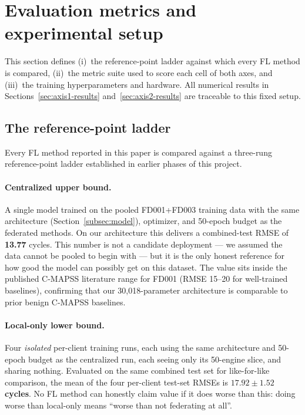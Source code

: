 \documentclass[a4paper,fleqn,doubleblind]{cas-sc}
\begin{document}

\section{Evaluation metrics and experimental setup}
\label{sec:setup}

This section defines (i)~the reference-point ladder against which
every FL method is compared, (ii)~the metric suite used to score
each cell of both axes, and (iii)~the training hyperparameters and
hardware. All numerical results in Sections~\ref{sec:axis1-results}
and~\ref{sec:axis2-results} are traceable to this fixed setup.

\subsection{The reference-point ladder}
\label{subsec:refladder}

Every FL method reported in this paper is compared against a
three-rung reference-point ladder established in earlier phases of
this project.

\paragraph{Centralized upper bound.}
A single model trained on the pooled FD001+FD003 training data with
the same architecture (Section~\ref{subsec:model}), optimizer, and
50-epoch budget as the federated methods. On our architecture this
delivers a combined-test RMSE of \textbf{13.77} cycles. This
number is not a candidate deployment --- we assumed the data cannot
be pooled to begin with --- but it is the only honest reference for
how good the model can possibly get on this dataset. The value
sits inside the published C-MAPSS literature range for FD001 (RMSE
15--20 for well-trained baselines), confirming that our
30{,}018-parameter architecture is comparable to prior benign
C-MAPSS baselines.

\paragraph{Local-only lower bound.}
Four \emph{isolated} per-client training runs, each using the same
architecture and 50-epoch budget as the centralized run, each
seeing only its 50-engine slice, and sharing nothing. Evaluated on
the same combined test set for like-for-like comparison, the mean
of the four per-client test-set RMSEs is
\textbf{$17.92 \pm 1.52$ cycles}. No FL method can honestly claim
value if it does worse than this: doing worse than local-only means
``worse than not federating at all''.
\end{document}
